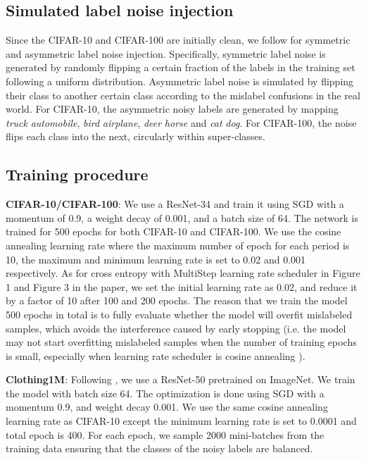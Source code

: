 \documentclass{article}
\begin{document}
\subsection{Simulated label noise injection}
\label{apd:noise_inject}
Since the CIFAR-10 and CIFAR-100 are initially clean, we follow \cite{tanaka2018joint,patrini2017making} for symmetric and asymmetric label noise injection. Specifically, symmetric label noise is generated by randomly flipping a certain fraction of the labels in the training set following a uniform distribution. Asymmetric label noise is simulated by flipping their class to another certain class according to the mislabel confusions in the real world. For CIFAR-10, the asymmetric noisy labels are generated by mapping \emph{truck}  \emph{automobile}, \emph{bird}  \emph{airplane}, \emph{deer}  \emph{horse} and \emph{cat}  \emph{dog}. For CIFAR-100, the noise flips each class into the next, circularly within super-classes.

\subsection{Training procedure}
\textbf{CIFAR-10/CIFAR-100}: We use a ResNet-34 and train it using SGD with a momentum of 0.9, a weight decay of 0.001, and a batch size of 64. The network is trained for 500 epochs for both CIFAR-10 and CIFAR-100. We use the cosine annealing learning rate \cite{loshchilov2016sgdr} where the maximum number of epoch for each period is 10, the maximum and minimum learning rate is set to 0.02 and 0.001 respectively. As for cross entropy with MultiStep learning rate scheduler  in Figure 1 and Figure 3 in the paper, we set the initial learning rate as 0.02, and reduce it by a factor of 10 after 100 and 200 epochs. The reason that we train the model 500 epochs in total is to fully evaluate whether the model will overfit mislabeled samples, which avoids the interference caused by early stopping \cite{li2020gradient} (i.e. the model may not start overfitting mislabeled samples when the number of training epochs is small, especially when learning rate scheduler is cosine annealing \cite{loshchilov2016sgdr}). 

\textbf{Clothing1M}: Following \cite{xiao2015learning,wang2019symmetric}, we use a ResNet-50 pretrained on ImageNet. We train the model with batch size 64. The optimization is done using SGD with a momentum 0.9, and weight decay 0.001. We use the same cosine annealing learning rate as CIFAR-10 except the minimum learning rate is set to 0.0001 and total epoch is 400. For each epoch, we sample 2000 mini-batches from the training data ensuring that the classes of the noisy labels are balanced.
\end{document}
